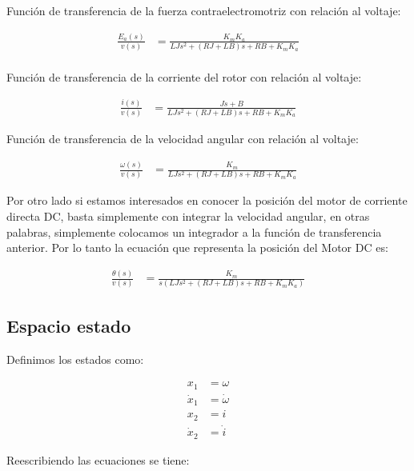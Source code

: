 \documentclass[journal]{IEEEtran}
\begin{document}
Función de transferencia de la fuerza contraelectromotriz con relación al voltaje:

\begin{align}
\frac{E_a(s)}{v(s)}&=\frac{K_m K_a}{LJs^2+(RJ+LB)s+RB+K_m K_a}
\end{align}
\\
Función de transferencia de la corriente del rotor con relación al voltaje:

\begin{align}
\frac{i(s)}{v(s)}&=\frac{Js+B}{LJs^2+(RJ+LB)s+RB+K_m K_a}
\end{align}

Función de transferencia de la velocidad angular con relación al voltaje:

\begin{align}
\frac{\omega(s)}{v(s)}&=\frac{K_m}{LJs^2+(RJ+LB)s+RB+K_m K_a}
\end{align}

Por otro lado si estamos interesados en conocer la posición del motor de corriente directa DC, basta simplemente con integrar la velocidad angular, en otras palabras, simplemente colocamos un integrador a la función de transferencia anterior. Por lo tanto la ecuación que representa la posición del Motor DC es:

\begin{align}
\frac{\theta(s)}{v(s)}&=\frac{K_m}{s(LJs^2+(RJ+LB)s+RB+K_m K_a)}
\end{align}

\subsection{Espacio estado}
Definimos los estados como:

\begin{align}
x_1&=\omega \\
\dot{x}_1&=\dot{\omega} \\
x_2&=i \\
\dot{x}_2&=\dot{i} 
\end{align}

Reescribiendo las ecuaciones se tiene:
\end{document}
